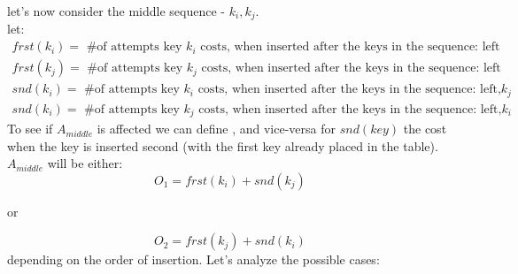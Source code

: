 \documentclass{report}
\begin{document}
let's now consider the middle sequence - $k_{i},k_{j}$.\medskip\\
let:
\begin{gather*}
    frst(k_{i}) = \text{ \# of attempts key $k_{i}$ costs, when inserted after the keys in the sequence: left}\\
    frst(k_{j}) = \text{ \# of attempts key $k_{j}$ costs, when inserted after the keys in the sequence: left}\\
    snd(k_{i}) = \text{ \# of attempts key $k_{i}$ costs, when inserted after the keys in the sequence: left,$k_{j}$}\\
    snd(k_{i}) = \text{ \# of attempts key $k_{j}$ costs, when inserted after the keys in the sequence: left,$k_{i}$}
\end{gather*} 
To see if $A_{middle}$ is affected we can define , and vice-versa for $snd(key)$ the cost when the key is inserted second (with the first key already placed in the table).\\
$A_{middle}$ will be either:
\begin{equation*}
    O_{1} = frst(k_{i}) + snd(k_{j})
\end{equation*}
\begin{center}
    or    
\end{center}
\begin{equation*}
    O_{2} = frst(k_{j}) + snd(k_{i}) 
\end{equation*}
depending on the order of insertion.
Let's analyze the possible cases:
\end{document}
